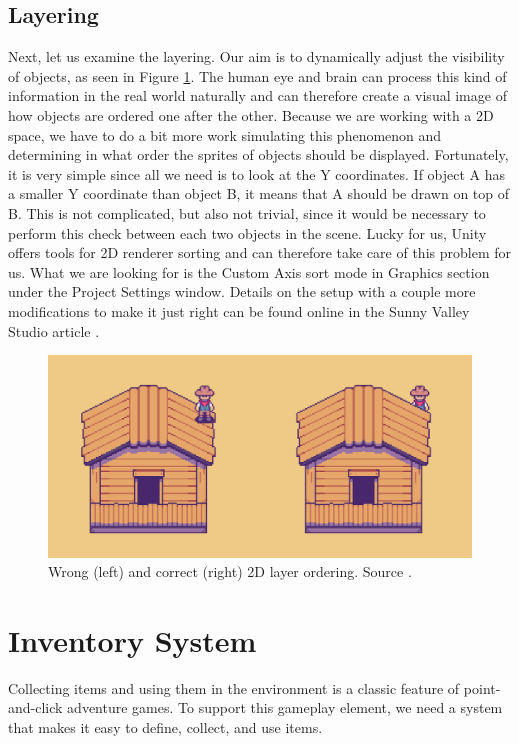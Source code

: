 \subsection{Layering}
Next, let us examine the layering. Our aim is to dynamically adjust the visibility of objects, as seen in Figure \ref{fig:Layers}. The human eye and brain can process this kind of information in the real world naturally and can therefore create a visual image of how objects are ordered one after the other. Because we are working with a 2D space, we have to do a bit more work simulating this phenomenon and determining in what order the sprites of objects should be displayed. Fortunately, it is very simple since all we need is to look at the Y coordinates. If object A has a smaller Y coordinate than object B, it means that A should be drawn on top of B. This is not complicated, but also not trivial, since it would be necessary to perform this check between each two objects in the scene. Lucky for us, Unity offers tools for 2D renderer sorting \cite{Unity-sorting} and can therefore take care of this problem for us. What we are looking for is the Custom Axis sort mode \cite{Unity-customAxis} in Graphics section under the Project Settings window. Details on the setup with a couple more modifications to make it just right can be found online in the Sunny Valley Studio article \cite{Piotr} . 

\begin{figure}[H]
\centering
\includegraphics[width=.8\linewidth]{img/layers.png}
\caption{Wrong (left) and correct (right) 2D layer ordering. Source \cite{Piotr}.}
\label{fig:Layers}
\end{figure}

\section{Inventory System}
Collecting items and using them in the environment is a classic feature of point-and-click adventure games. To support this gameplay element, we need a system that makes it easy to define, collect, and use items.

